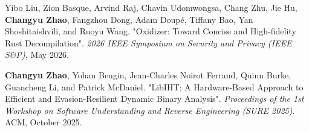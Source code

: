 
\begin{cventries}

  \cventry
    {}{}{}{}
    {
      \vspace{-4mm}
      \begin{cvitems}
        \item {Yibo Liu, Zion Basque, Arvind Raj, Chavin Udomwongsa, Chang Zhu, Jie Hu, \textbf{Changyu Zhao}, Fangzhou Dong, Adam Doupé, Tiffany Bao, Yan Shoshitaishvili, and Ruoyu Wang. "Oxidizer: Toward Concise and High-fidelity Rust Decompilation". \textit{2026 IEEE Symposium on Security and Privacy (IEEE S\&P)}, May 2026.}
        \item {\textbf{Changyu Zhao}, Yohan Beugin, Jean-Charles Noirot Ferrand, Quinn Burke, Guancheng Li, and Patrick McDaniel. "LibIHT: A Hardware-Based Approach to Efficient and Evasion-Resilient Dynamic Binary Analysis". \textit{Proceedings of the 1st Workshop on Software Understanding and Reverse Engineering (SURE 2025)}. ACM, October 2025.}
      \end{cvitems}
    }

\end{cventries}
